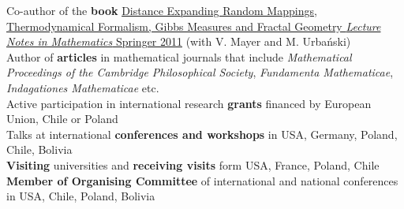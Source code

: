 \documentclass[a4paper, oneside]{scrreprt}
\begin{document}
\noindent\llap{\FA \faBook\ \ }Co-author of the \textbf{book} \href{http://www.amazon.com/Distance-Expanding-Thermodynamical-Formalism-Mathematics/dp/3642236499/ref=sr_1_1?s=books&ie=UTF8&qid=1410309067&sr=1-1}{Distance Expanding Random Mappings, Thermodynamical Formalism, Gibbs Measures and Fractal Geometry \textit{Lecture Notes in Mathematics} Springer 2011} (with V. Mayer and M. Urbański)\\
\noindent\llap{\FA \faPencil\ \ }Author of \textbf{articles} in 
mathematical journals that include  
\textit{Mathematical Proceedings of the Cambridge Philosophical Society}, \textit{Fundamenta Mathematicae}, \textit{Indagationes Mathematicae} etc.\\
\noindent\llap{\FA \faFlask\ \ }Active participation in international research \textbf{grants} financed by European Union, Chile or Poland\\
\noindent\llap{\FA \faBullhorn\ \ }Talks at international 
\textbf{conferences and workshops} in USA, Germany, Poland, 
Chile, Bolivia\\
\noindent\llap{\FA \faExchange\ \ }\textbf{Visiting} 
universities and \textbf{receiving visits} form USA, France, Poland, Chile\\
\noindent\llap{\FA \faCalendar\ \ }\textbf{Member of Organising Committee}
of international and national conferences in USA, Chile, Poland, Bolivia\\

\vspace{-0.3cm}
\noindent\makebox[\linewidth]{\rule{\textwidth}{0.4pt}}
\end{document}
